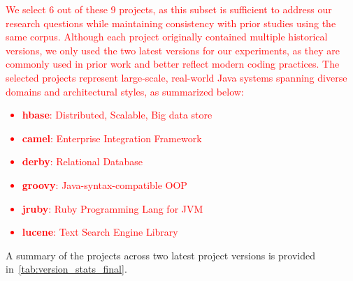 \documentclass[authoryear,final,5p,times,twocolumn]{elsarticle}
\theoremstyle{plain}
\begin{document}
\textcolor{red}{
We select 6 out of these 9 projects, as this subset is sufficient to address our research questions while maintaining consistency with prior studies using the same corpus. Although each project originally contained multiple historical versions, we only used the two latest versions for our experiments, as they are commonly used in prior work and better reflect modern coding practices. The selected projects represent large-scale, real-world Java systems spanning diverse domains and architectural styles, as summarized below:
}
\textcolor{red}{
\begin{itemize}
    \item \textbf{hbase}: Distributed, Scalable, Big data store
    \item \textbf{camel}: Enterprise Integration Framework
    \item \textbf{derby}: Relational Database
    \item \textbf{groovy}: Java-syntax-compatible OOP
    \item \textbf{jruby}: Ruby Programming Lang for JVM
    \item \textbf{lucene}: Text Search Engine Library
\end{itemize}
}
A summary of the projects across two latest project versions is provided in~\autoref{tab:version_stats_final}.


\begin{table}[!htbp]
\centering
\caption{Dataset version statistics.}
\label{tab:version_stats_final}
\small
{}
\end{table}
\end{document}
